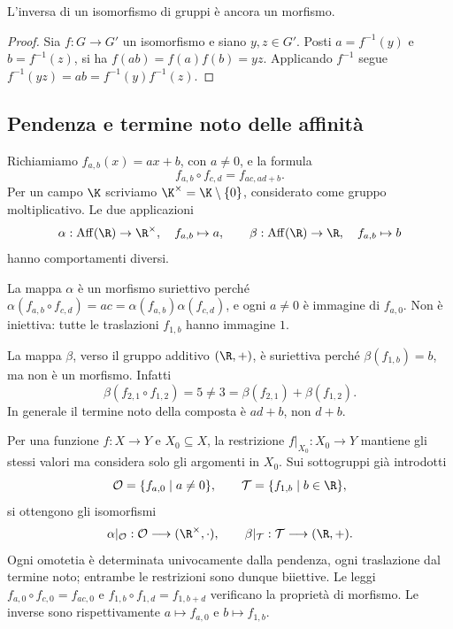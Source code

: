 \begin{proposizione}\label{prop:inversa-iso-gruppi}
L'inversa di un isomorfismo di gruppi è ancora un morfismo.
\end{proposizione}
\begin{proof}
Sia $f:G\to G'$ un isomorfismo e siano $y,z\in G'$. Posti $a=f^{-1}(y)$ e $b=f^{-1}(z)$, si ha $f(ab)=f(a)f(b)=yz$. Applicando $f^{-1}$ segue $f^{-1}(yz)=ab=f^{-1}(y)f^{-1}(z)$.
\end{proof}

\subsection{Pendenza e termine noto delle affinità}
Richiamiamo $f_{a,b}(x)=ax+b$, con $a\ne0$, e la formula
\[
f_{a,b}\circ f_{c,d}=f_{ac,ad+b}.
\]
Per un campo $\K$ scriviamo $\K^\times=\K\setminus\{0\}$, considerato come gruppo moltiplicativo. Le due applicazioni
\[
\alpha:\operatorname{Aff}(\R)\to\R^\times,\quad f_{a,b}\mapsto a,
\qquad
\beta:\operatorname{Aff}(\R)\to\R,\quad f_{a,b}\mapsto b
\]
hanno comportamenti diversi.

\begin{esempio}
La mappa $\alpha$ è un morfismo suriettivo perché $\alpha(f_{a,b}\circ f_{c,d})=ac=\alpha(f_{a,b})\alpha(f_{c,d})$, e ogni $a\ne0$ è immagine di $f_{a,0}$. Non è iniettiva: tutte le traslazioni $f_{1,b}$ hanno immagine $1$.

La mappa $\beta$, verso il gruppo additivo $(\R,+)$, è suriettiva perché $\beta(f_{1,b})=b$, ma non è un morfismo. Infatti
\[
\beta(f_{2,1}\circ f_{1,2})=5\ne3=\beta(f_{2,1})+\beta(f_{1,2}).
\]
In generale il termine noto della composta è $ad+b$, non $d+b$.
\end{esempio}

\begin{esempio}
Per una funzione $f:X\to Y$ e $X_0\subseteq X$, la restrizione $f|_{X_0}:X_0\to Y$ mantiene gli stessi valori ma considera solo gli argomenti in $X_0$. Sui sottogruppi già introdotti
\[
\mathcal O=\{f_{a,0}\mid a\ne0\},\qquad
\mathcal T=\{f_{1,b}\mid b\in\R\},
\]
si ottengono gli isomorfismi
\[
\alpha|_{\mathcal O}:\mathcal O\longrightarrow(\R^\times,\cdot),
\qquad
\beta|_{\mathcal T}:\mathcal T\longrightarrow(\R,+).
\]
Ogni omotetia è determinata univocamente dalla pendenza, ogni traslazione dal termine noto; entrambe le restrizioni sono dunque biiettive. Le leggi $f_{a,0}\circ f_{c,0}=f_{ac,0}$ e $f_{1,b}\circ f_{1,d}=f_{1,b+d}$ verificano la proprietà di morfismo. Le inverse sono rispettivamente $a\mapsto f_{a,0}$ e $b\mapsto f_{1,b}$.
\end{esempio}

